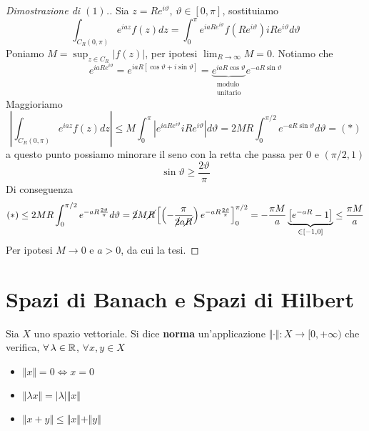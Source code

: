 \begin{proof}[Dimostrazione di $(1)$.]

Sia $z = Re^{i\vartheta}$, $\vartheta \in [0, \pi]$, sostituiamo
\begin{equation*}
\int_{C_{R} (0, \pi)} e^{iaz} f(z)dz = \int^{\pi}_{0} e^{iaRe^{i\vartheta}} f\left(Re^{i\vartheta}\right) iRe^{i\vartheta} d\vartheta
\end{equation*}
Poniamo $M = \sup_{z\in C_{R}}| f(z)| $, per ipotesi $\lim_{R\rightarrow \infty} M = 0$. Notiamo che
\begin{equation*}
e^{iaRe^{i\vartheta}} = e^{iaR[\cos \vartheta + i\sin \vartheta]} = \underbrace{e^{iaR\cos \vartheta}}_{\substack{\text{modulo}\\\text{unitario}}} e^{- aR\sin \vartheta}
\end{equation*}
Maggioriamo
\begin{equation*}
\left| \int_{C_{R} (0, \pi)} e^{iaz} f(z)dz\right| \leq M\int^{\pi}_{0}\left| e^{iaRe^{i\vartheta}} iRe^{i\vartheta}\right| d\vartheta = 2MR\int^{\pi /2}_{0} e^{- aR\sin \vartheta} d\vartheta = (*)
\end{equation*}
a questo punto possiamo minorare il seno con la retta che passa per $0$ e $(\pi /2, 1)$
\begin{equation*}
\sin \vartheta \geq \frac{2\vartheta}{\pi}
\end{equation*}
Di conseguenza
\begin{equation*}
(*) \leq 2MR\int^{\pi /2}_{0} e^{- aR\frac{2\vartheta}{\pi}} d\vartheta = \cancel{2} M\cancel{R}\left[\left(- \frac{\pi}{\cancel{2} a\cancel{R}}\right) e^{- aR\frac{2\vartheta}{\pi}}\right]^{\pi /2}_{0} = - \frac{\pi M}{a}\underbrace{\left[e^{- aR} - 1\right]}_{\in [ - 1, 0]} \leq \frac{\pi M}{a}
\end{equation*}
Per ipotesi $M\rightarrow 0$ e $a > 0$, da cui la tesi.
\end{proof}

\chapter{Spazi di Banach e Spazi di Hilbert}

\begin{defn}
[Norma]
Sia $X$ uno spazio vettoriale. Si dice \textbf{norma} un'applicazione $ \Vert \cdot \Vert : X\rightarrow [0, + \infty)$ che verifica, $\forall \lambda \in \RR$, $\forall x, y\in X$
\begin{itemize}
\item $ \Vert x \Vert = 0\iff x = 0$
\item $ \Vert \lambda x \Vert = | \lambda | \Vert x \Vert $
\item $ \Vert x + y \Vert \leq \Vert x \Vert + \Vert y \Vert $
\end{itemize}
\end{defn}

